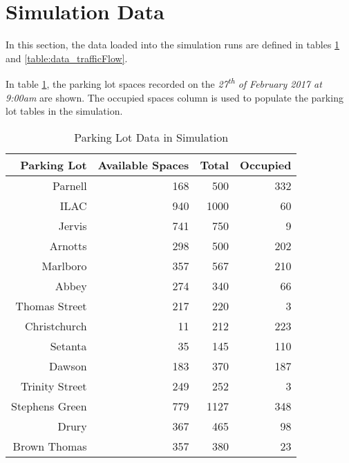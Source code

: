 \section{Simulation Data}
In this section, the data loaded into the simulation runs are defined in tables \ref{table:data_parkinglot} and \ref{table:data_trafficFlow}.

In table \ref{table:data_parkinglot}, the parking lot spaces recorded on the \textit{27\textsuperscript{th} of February 2017 at 9:00am} are shown. The occupied spaces column is used to populate the parking lot tables in the simulation.
\begin{table}[H]
    \begin{center}
        \begin{tabular}{|r|r|r|r|}
            \hline
            Parking Lot & Available Spaces & Total & Occupied \\
            \hline\hline
            Parnell & 168 & 500 & 332\\ \hline
            ILAC & 940 & 1000 & 60\\\hline
            Jervis & 741 & 750 & 9\\ \hline
            Arnotts & 298 & 500 & 202 \\\hline
            Marlboro & 357 & 567 & 210 \\ \hline
            Abbey & 274 & 340 & 66 \\  \hline
            Thomas Street & 217 & 220 & 3 \\ \hline
            Christchurch & 11 & 212 & 223 \\ \hline
            Setanta & 35 & 145 & 110 \\ \hline
            Dawson & 183 & 370 & 187 \\ \hline
            Trinity Street & 249 & 252 & 3 \\ \hline
            Stephens Green & 779 & 1127 & 348 \\ \hline
            Drury & 367 & 465 & 98 \\ \hline
            Brown Thomas & 357 & 380 & 23 \\ \hline
        \end{tabular}
        \caption{Parking Lot Data in Simulation}
        \label{table:data_parkinglot} 
    \end{center}
\end{table}

